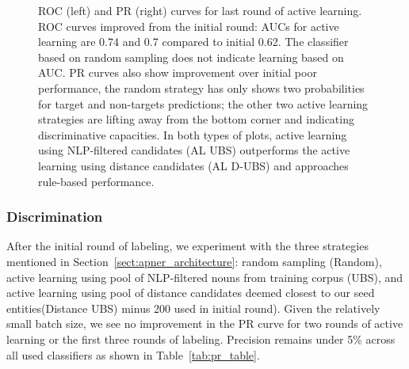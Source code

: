 \begin{figure}
\begin{minipage}[b]{.4\textwidth}
\captionsetup{labelformat=empty}
\label{fig:prcs_round5}
\end{minipage}
\setcounter{figure}{8}  
\caption{ROC (left) and PR (right) curves for last round of active learning. 
ROC curves improved from the initial round: AUCs for active learning are 0.74 and 0.7 compared to initial 0.62. 
The classifier based on random sampling does not indicate learning based on AUC. PR curves also show improvement over initial poor performance,
the random strategy has only shows two probabilities for target and non-targets predictions; the other two active learning strategies are lifting away from the bottom corner and indicating discriminative capacities.
In both types of plots, active learning using NLP-filtered candidates (AL UBS) outperforms the active learning using distance candidates (AL D-UBS) and approaches rule-based performance.
}\label{fig:rocs_prcs_round5}
\end{figure}

\subsubsection{Discrimination}
After the initial round of labeling, we experiment with the three strategies mentioned in Section~\ref{sect:apner_architecture}: random sampling (Random), active learning using pool of NLP-filtered nouns from training corpus (UBS), and active learning using pool of  distance candidates deemed closest to our seed entities(Distance UBS) \textemdash minus 200 used in initial round).
Given the relatively small batch size, we see no improvement in the PR curve for two rounds of active learning or the first three rounds of labeling. 
Precision remains under 5\% across all used classifiers as shown in Table~\ref{tab:pr_table}. 

